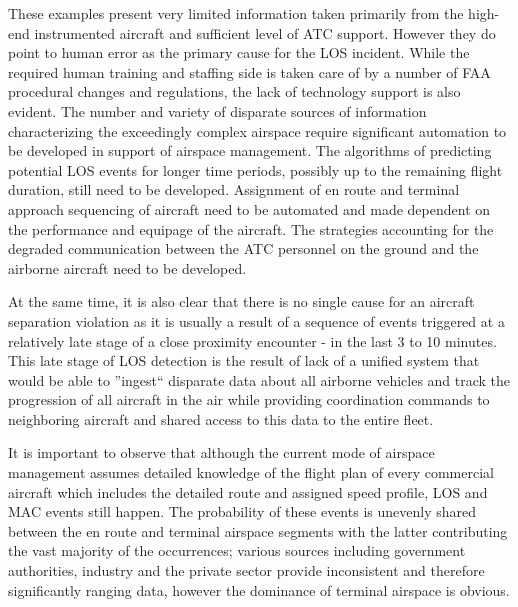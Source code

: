 \documentclass[letter,onecolumn,12pt]{aiaa-tc}
\newcommand{\1}{1_n}
\begin{document}
These examples present very limited information taken primarily from the high-end instrumented aircraft and sufficient level of ATC support. However they do point to human error as the primary cause for the LOS incident. While the required human training and staffing side is taken care of by a number of FAA procedural changes and regulations\cite{OIG_AR2013}, the lack of technology support is also evident. The number and variety of disparate sources of information characterizing the exceedingly complex airspace require significant automation to be developed in support of airspace management. The algorithms of predicting potential LOS events for longer time periods, possibly up to the remaining flight duration, still need to be developed. Assignment of en route and terminal approach sequencing of aircraft need to be automated and made dependent on the performance and equipage of the aircraft. The strategies accounting for the degraded communication between the ATC personnel on the ground and the airborne aircraft need to be developed.

At the same time, it is also clear that there is no single cause for an aircraft separation violation as it is usually a result of  a sequence of events triggered at a relatively late stage of a close proximity encounter - in the last 3 to 10 minutes. This late stage of LOS detection is the result of lack of a unified system that would be able to ''ingest`` disparate data about all airborne vehicles and track the progression of all aircraft in the air while providing coordination commands to neighboring aircraft and shared access to this data to the entire fleet.

It is important to observe that although the current mode of airspace management assumes detailed knowledge of the flight plan of every commercial aircraft which includes the detailed route and assigned speed profile,  LOS and MAC events still happen. The probability of these events is unevenly shared between the en route and terminal airspace segments with the latter contributing the vast majority of the occurrences; various sources including government authorities, industry and the private sector provide inconsistent and therefore significantly ranging data, however the dominance of terminal airspace is obvious.
\end{document}

